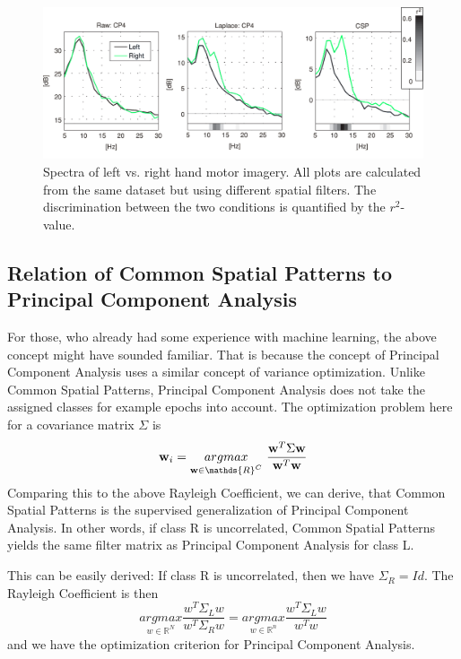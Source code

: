 \documentclass[12pt,twoside,twocolumn]{article}
\begin{document}
\begin{figure}
  \includegraphics[scale=0.29]{spectracsplp.png}
  \caption{Spectra of left vs. right hand motor imagery. All plots are calculated from the same dataset but using different spatial filters. The discrimination between the two conditions is quantified by the $r^2$-value.}
\end{figure}

\subsection{Relation of Common Spatial Patterns to Principal Component Analysis}
For those, who already had some experience with machine learning, the above concept might have sounded familiar. That is because the concept of Principal Component Analysis uses a similar concept of variance optimization. Unlike Common Spatial Patterns, Principal Component Analysis does not take the assigned classes for example epochs into account. The optimization problem here for a covariance matrix $\Sigma$ is 
\begin{equation}
		{\bf w}_i = \underset{{\bf w} \in \mathds{R}^{C}}{argmax}  \  \frac{{\bf w}^T \Sigma {\bf w}}{{\bf w}^T{\bf w}}
\end{equation}
Comparing this to the above Rayleigh Coefficient, we can derive, that Common Spatial Patterns is the supervised generalization of Principal Component Analysis. In other words, if class R is uncorrelated, Common Spatial Patterns yields the same filter matrix as Principal Component Analysis for class L. 

This can be easily derived: If class R is uncorrelated, then we have $\Sigma_R = Id$. The Rayleigh Coefficient is then
\begin{equation}
	\underset{w \in \mathds{R}^{N}}{argmax} \frac{w^T \Sigma_{L} w}{w^T \Sigma_{R} w} = \underset{w \in \mathds{R}^{n}}{argmax} \frac{w^T \Sigma_{L} w}{w^T w}
\end{equation}
and we have the optimization criterion for Principal Component Analysis.
\end{document}
